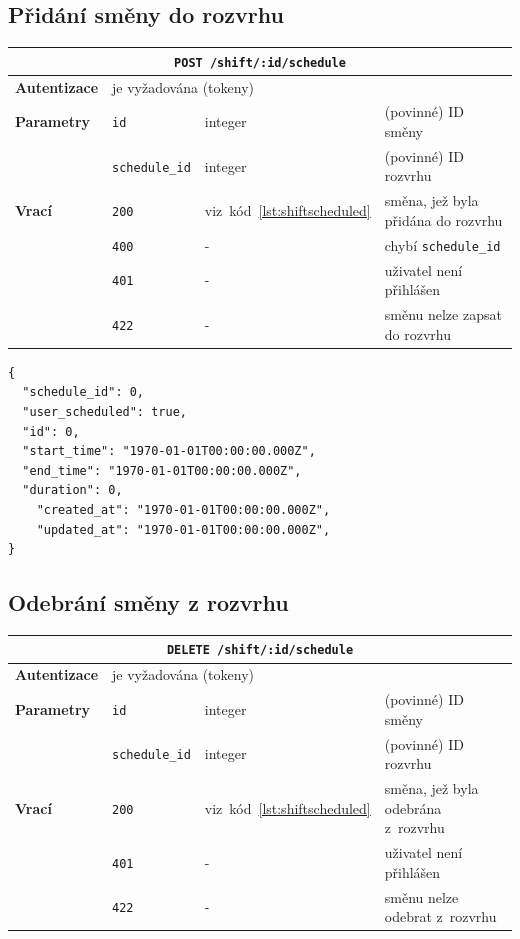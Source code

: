 \documentclass[twoside]{ctuthesis}
\begin{document}
\subsection{Přidání směny do rozvrhu}

\begin{center}
	\begin{tabular}{p{.19\linewidth}p{.18\linewidth}p{.15\linewidth}p{.35\linewidth}}
		\hline
		\multicolumn{4}{c}{\texttt{POST /shift/:id/schedule}}\\
		\hline
		\textbf{Autentizace}  & 	\multicolumn{3}{l}{je vyžadována (tokeny)}\\
		\textbf{Parametry} 		& \texttt{id} & integer & (povinné) ID směny \\
												 	& \texttt{schedule\_id} & integer & (povinné) ID rozvrhu \\
		\textbf{Vrací} 				& \texttt{200} & viz~kód~\ref{lst:shiftscheduled} & směna, jež byla přidána do rozvrhu\\
													& \texttt{400} & - & chybí \texttt{schedule\_id}\\
													& \texttt{401} & - & uživatel není přihlášen\\
													& \texttt{422} & - & směnu nelze zapsat do rozvrhu\\
		\hline
	\end{tabular}
\end{center}

\begin{lstlisting}[caption={Odpověď po přidání směny do / odebrání směny z~rozvrhu}, label={lst:shiftscheduled}]
{
  "schedule_id": 0,
  "user_scheduled": true,
  "id": 0,
  "start_time": "1970-01-01T00:00:00.000Z",
  "end_time": "1970-01-01T00:00:00.000Z",
  "duration": 0,
	"created_at": "1970-01-01T00:00:00.000Z",
	"updated_at": "1970-01-01T00:00:00.000Z",
}
\end{lstlisting}

\subsection{Odebrání směny z rozvrhu}

\begin{center}
	\begin{tabular}{p{.19\linewidth}p{.18\linewidth}p{.15\linewidth}p{.35\linewidth}}
		\hline
		\multicolumn{4}{c}{\texttt{DELETE /shift/:id/schedule}}\\
		\hline
		\textbf{Autentizace}  & 	\multicolumn{3}{l}{je vyžadována (tokeny)}\\
		\textbf{Parametry} 		& \texttt{id} & integer & (povinné) ID směny \\
												 	& \texttt{schedule\_id} & integer & (povinné) ID rozvrhu \\
		\textbf{Vrací} 				& \texttt{200} & viz~kód~\ref{lst:shiftscheduled} & směna, jež byla odebrána z~rozvrhu\\
													& \texttt{401} & - & uživatel není přihlášen\\
													& \texttt{422} & - & směnu nelze odebrat z~rozvrhu\\
		\hline
	\end{tabular}
\end{center}
\end{document}
